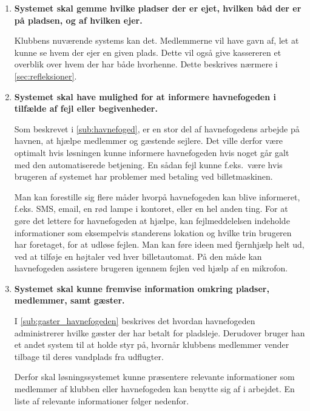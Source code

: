 \begin{enumerate}
\item \label{itm:gemme_pladser_baade} \textbf{Systemet skal gemme hvilke pladser der er ejet, hvilken båd der er på pladsen, og af hvilken ejer.}

  Klubbens nuværende systems kan det. Medlemmerne vil have gavn af, let at kunne se hvem der ejer en given plads. Dette vil også give kassereren et overblik over hvem der har både hvorhenne. Dette beskrives nærmere i \cref{sec:refleksioner}.

\item \label{itm:fejl} \textbf{Systemet skal have mulighed for at informere havnefogeden i tilfælde af fejl eller begivenheder.}

  Som beskrevet i \cref{sub:havnefoged}, er en stor del af havnefogedens arbejde på havnen, at hjælpe medlemmer og gæstende sejlere. Det ville derfor være optimalt hvis løsningen kunne informere havnefogeden hvis noget går galt med den automatiserede betjening. En sådan fejl kunne f.eks.\ være hvis brugeren af systemet har problemer med betaling ved billetmaskinen.

  Man kan forestille sig flere måder hvorpå havnefogeden kan blive informeret, f.eks. SMS, email, en rød lampe i kontoret, eller en hel anden ting. For at gøre det lettere for havnefogeden at hjælpe, kan fejlmeddelelsen indeholde informationer som eksempelvis standerens lokation og hvilke trin brugeren har foretaget, for at udløse fejlen. Man kan føre ideen med fjernhjælp helt ud, ved at tilføje en højtaler ved hver billetautomat. På den måde kan havnefogeden assistere brugeren igennem fejlen ved hjælp af en mikrofon.

\item \label{itm:vis_information} \textbf{Systemet skal kunne fremvise information omkring pladser, medlemmer, samt gæster.}

  I \cref{sub:gaster_havnefogeden} beskrives det hvordan havnefogeden administrerer hvilke gæster der har betalt for pladsleje. Derudover bruger han et andet system til at holde styr på, hvornår klubbens medlemmer vender tilbage til deres vandplads fra udflugter.

  Derfor skal løsningssystemet kunne præsentere relevante informationer som medlemmer af klubben eller havnefogeden kan benytte sig af i arbejdet. En liste af relevante informationer følger nedenfor.


\end{enumerate}
